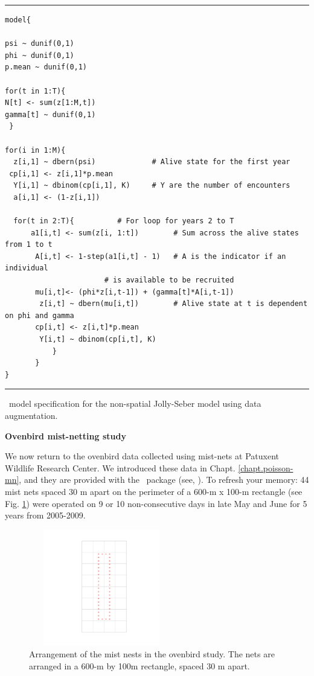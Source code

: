 \begin{panel}[htp]
\centering
\rule[0.1in]{\textwidth}{.03in}
{\small
\begin{verbatim}
model{

psi ~ dunif(0,1)
phi ~ dunif(0,1)
p.mean ~ dunif(0,1)

for(t in 1:T){
N[t] <- sum(z[1:M,t])
gamma[t] ~ dunif(0,1)
 }

for(i in 1:M){
  z[i,1] ~ dbern(psi)	          # Alive state for the first year
 cp[i,1] <- z[i,1]*p.mean
  Y[i,1] ~ dbinom(cp[i,1], K)     # Y are the number of encounters
  a[i,1] <- (1-z[i,1])

  for(t in 2:T){		  # For loop for years 2 to T
      a1[i,t] <- sum(z[i, 1:t])        # Sum across the alive states from 1 to t
       A[i,t] <- 1-step(a1[i,t] - 1)   # A is the indicator if an individual
					   # is available to be recruited
       mu[i,t]<- (phi*z[i,t-1]) + (gamma[t]*A[i,t-1])
        z[i,t] ~ dbern(mu[i,t])        # Alive state at t is dependent on phi and gamma
       cp[i,t] <- z[i,t]*p.mean
        Y[i,t] ~ dbinom(cp[i,t], K)
           }  
       } 
} 
\end{verbatim}
}

\rule[-0.1in]{\textwidth}{.03in}
\caption{
\jags~model specification for the non-spatial Jolly-Seber model using
data augmentation. }
\label{open.panel.nsJS}
\end{panel}



{\bf Ovenbird mist-netting study}

We now return to the ovenbird data collected using mist-nets at
Patuxent Wildlife Research Center. We introduced these data 
 in Chapt. \ref{chapt.poisson-mn}, and they are provided with the 
 \secr~package (see, \citet{efford_etal:2004,
  borchers_efford:2008}). To refresh your memory: 44 mist nets spaced
30 m apart on the perimeter of a 600-m x 100-m rectangle (see
Fig. \ref{open.figs.ovenbirdlocs}) were operated on 9 or 10 non-consecutive days in late May
and June for 5 years from 2005-2009.

\begin{figure}
\centering
\includegraphics[height=2in,width=2.5in]{Ch16-Open/figs/ovenbirds.pdf}
\caption{Arrangement of the mist nests in the ovenbird study.  The nets are arranged in a 600-m by 100m
rectangle, spaced 30 m apart. }
\label{open.figs.ovenbirdlocs}
\end{figure}



